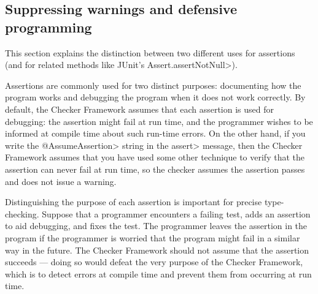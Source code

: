 


\subsection{Suppressing warnings and defensive programming\label{defensive-programming}}

This section explains the distinction between two different uses for
assertions (and for related methods like JUnit's \<Assert.assertNotNull>).

Assertions are commonly used for two distinct purposes:  documenting how
the program works and debugging the program when it does not work
correctly.  By default, the Checker Framework assumes that each assertion
is used for debugging:  the assertion might fail at run time, and the programmer
wishes to be informed at compile time about such run-time errors.  On the
other hand, if you write the \<@AssumeAssertion> string in the \<assert>
message, then the Checker Framework assumes that you have used some other
technique to verify that the assertion can never fail at run time, so the
checker assumes the assertion passes and does not issue a warning.

Distinguishing the purpose of each assertion is important for precise
type-checking.
Suppose that a
programmer encounters a failing test, adds an assertion to aid debugging, and fixes the
test.  The programmer leaves the assertion in the program if the programmer
is worried that the program might fail in a similar way in the future.
The Checker Framework should not assume that the assertion succeeds ---
doing so would defeat the very purpose of the Checker Framework, which is
to detect errors at compile time and prevent them from occurring at run
time.

